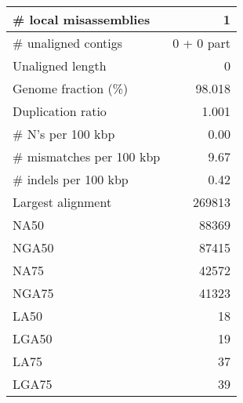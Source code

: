 \documentclass[12pt,a4paper]{article}
\begin{document}
\begin{table}[ht]
\begin{center}
\begin{tabular}{|l*{1}{|r}|}
\# local misassemblies & 1 \\ \hline
\# unaligned contigs & 0 + 0 part \\ \hline
Unaligned length & 0 \\ \hline
Genome fraction (\%) & 98.018 \\ \hline
Duplication ratio & 1.001 \\ \hline
\# N's per 100 kbp & 0.00 \\ \hline
\# mismatches per 100 kbp & 9.67 \\ \hline
\# indels per 100 kbp & 0.42 \\ \hline
Largest alignment & 269813 \\ \hline
NA50 & 88369 \\ \hline
NGA50 & 87415 \\ \hline
NA75 & 42572 \\ \hline
NGA75 & 41323 \\ \hline
LA50 & 18 \\ \hline
LGA50 & 19 \\ \hline
LA75 & 37 \\ \hline
LGA75 & 39 \\ \hline
\end{tabular}
\end{center}
\end{table}
\end{document}
